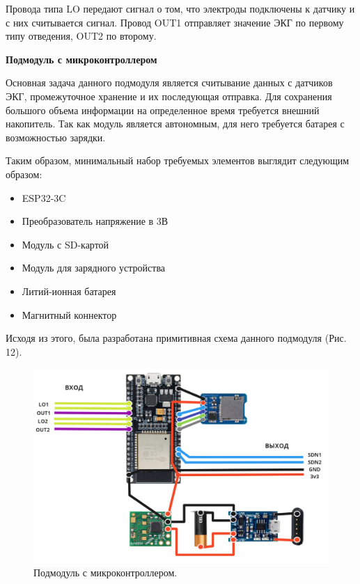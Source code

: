 \documentclass[12pt, russian]{extarticle}
\begin{document}
\begin{spacing}{1.5}
Провода типа LO передают сигнал о том, что электроды подключены к датчику и с них считывается сигнал. Провод OUT1 отправляет значение ЭКГ по первому типу отведения, OUT2 по второму.

\par\textbf{Подмодуль с микроконтроллером}

Основная задача данного подмодуля является считывание данных с датчиков ЭКГ, промежуточное хранение и их последующая отправка. Для сохранения большого объема информации на определенное время требуется внешний накопитель. Так как модуль является автономным, для него требуется батарея с возможностью зарядки.

Таким образом, минимальный набор требуемых элементов выглядит следующим образом:

\begin{itemize}
    \item ESP32-3C
    \item Преобразователь напряжение в 3В
    \item Модуль с SD-картой
    \item Модуль для зарядного устройства
    \item Литий-ионная батарея
    \item Магнитный коннектор
\end{itemize}

Исходя из этого, была разработана примитивная схема данного подмодуля (Рис. 12).
\newpage

\begin{figure}[htbp]
\centering
\includegraphics[scale=0.45]{resources/2.png}
\caption{Подмодуль с микроконтроллером.}
\label{fig:my_label}
\end{figure}


\end{spacing}
\end{document}
